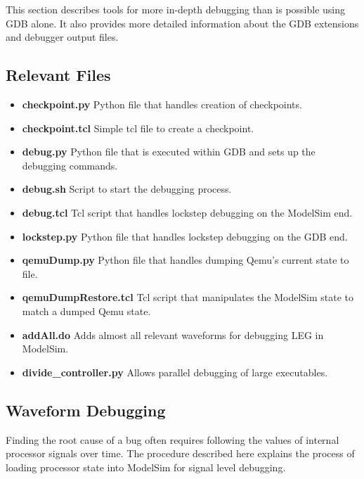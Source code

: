 This section describes tools for more in-depth debugging than is possible using GDB alone. 
It also provides more detailed information about the GDB extensions and debugger output files.

\subsection{Relevant Files}

\begin{itemize}
\item \textbf{checkpoint.py} Python file that handles creation of checkpoints.
\item \textbf{checkpoint.tcl} Simple tcl file to create a checkpoint.
\item \textbf{debug.py} Python file that is executed within GDB and sets up the debugging commands.
\item \textbf{debug.sh} Script to start the debugging process.
\item \textbf{debug.tcl} Tcl script that handles lockstep debugging on the ModelSim end.
\item \textbf{lockstep.py} Python file that handles lockstep debugging on the GDB end.
\item \textbf{qemuDump.py} Python file that handles dumping Qemu's current state to file.
\item \textbf{qemuDumpRestore.tcl} Tcl script that manipulates the ModelSim state to match a dumped Qemu state.
\item \textbf{addAll.do} Adds almost all relevant waveforms for debugging LEG in ModelSim.
\item \textbf{divide\_controller.py} Allows parallel debugging of large executables. 
\end{itemize}

\subsection{Waveform Debugging}\label{sec:MSdebug}
Finding the root cause of a bug often requires following the values of internal processor signals over time.
The procedure described here explains the process of loading processor state into ModelSim for signal level debugging.

